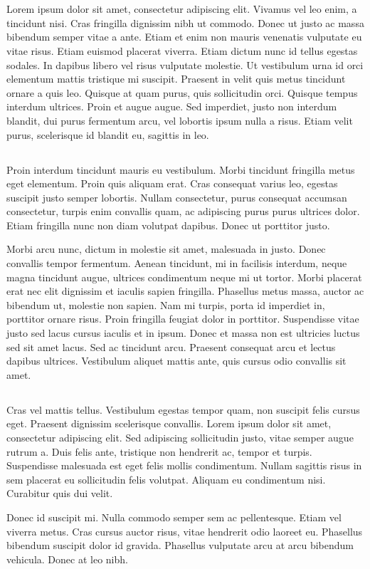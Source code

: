 \section{}

Lorem ipsum dolor sit amet, consectetur adipiscing elit. Vivamus vel leo enim, a tincidunt nisi. Cras fringilla dignissim nibh ut commodo. Donec ut justo ac massa bibendum semper vitae a ante. Etiam et enim non mauris venenatis vulputate eu vitae risus. Etiam euismod placerat viverra. Etiam dictum nunc id tellus egestas sodales. In dapibus libero vel risus vulputate molestie. Ut vestibulum urna id orci elementum mattis tristique mi suscipit. Praesent in velit quis metus tincidunt ornare a quis leo. Quisque at quam purus, quis sollicitudin orci. Quisque tempus interdum ultrices. Proin et augue augue. Sed imperdiet, justo non interdum blandit, dui purus fermentum arcu, vel lobortis ipsum nulla a risus. Etiam velit purus, scelerisque id blandit eu, sagittis in leo.

\subsection{}
Proin interdum tincidunt mauris eu vestibulum. Morbi tincidunt fringilla metus eget elementum. Proin quis aliquam erat. Cras consequat varius leo, egestas suscipit justo semper lobortis. Nullam consectetur, purus consequat accumsan consectetur, turpis enim convallis quam, ac adipiscing purus purus ultrices dolor. Etiam fringilla nunc non diam volutpat dapibus. Donec ut porttitor justo.

Morbi arcu nunc, dictum in molestie sit amet, malesuada in justo. Donec convallis tempor fermentum. Aenean tincidunt, mi in facilisis interdum, neque magna tincidunt augue, ultrices condimentum neque mi ut tortor. Morbi placerat erat nec elit dignissim et iaculis sapien fringilla. Phasellus metus massa, auctor ac bibendum ut, molestie non sapien. Nam mi turpis, porta id imperdiet in, porttitor ornare risus. Proin fringilla feugiat dolor in porttitor. Suspendisse vitae justo sed lacus cursus iaculis et in ipsum. Donec et massa non est ultricies luctus sed sit amet lacus. Sed ac tincidunt arcu. Praesent consequat arcu et lectus dapibus ultrices. Vestibulum aliquet mattis ante, quis cursus odio convallis sit amet.

\subsection{}
Cras vel mattis tellus. Vestibulum egestas tempor quam, non suscipit felis cursus eget. Praesent dignissim scelerisque convallis. Lorem ipsum dolor sit amet, consectetur adipiscing elit. Sed adipiscing sollicitudin justo, vitae semper augue rutrum a. Duis felis ante, tristique non hendrerit ac, tempor et turpis. Suspendisse malesuada est eget felis mollis condimentum. Nullam sagittis risus in sem placerat eu sollicitudin felis volutpat. Aliquam eu condimentum nisi. Curabitur quis dui velit.

Donec id suscipit mi. Nulla commodo semper sem ac pellentesque. Etiam vel viverra metus. Cras cursus auctor risus, vitae hendrerit odio laoreet eu. Phasellus bibendum suscipit dolor id gravida. Phasellus vulputate arcu at arcu bibendum vehicula. Donec at leo nibh.